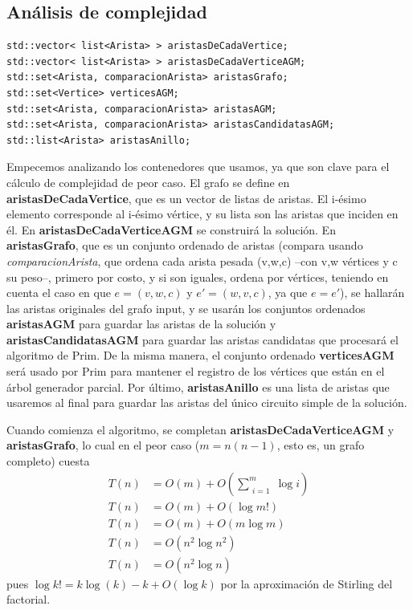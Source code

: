 \newpage

\subsection{Análisis de complejidad}

\begin{minipage}{\linewidth}
\begin{lstlisting}[basicstyle=\normalsize\ttfamily, frame=single]
std::vector< list<Arista> > aristasDeCadaVertice;
std::vector< list<Arista> > aristasDeCadaVerticeAGM;
std::set<Arista, comparacionArista> aristasGrafo;
std::set<Vertice> verticesAGM;
std::set<Arista, comparacionArista> aristasAGM;
std::set<Arista, comparacionArista> aristasCandidatasAGM;
std::list<Arista> aristasAnillo;
\end{lstlisting}
\end{minipage}

Empecemos analizando los contenedores que usamos, ya que son clave para el cálculo de complejidad de peor caso. El grafo se define en \textbf{aristasDeCadaVertice}, que es un vector de listas de aristas. El i-ésimo elemento corresponde al i-ésimo vértice, y su lista son las aristas que inciden en él. En \textbf{aristasDeCadaVerticeAGM} se construirá la solución. En \textbf{aristasGrafo}, que es un conjunto ordenado de aristas (compara usando \emph{comparacionArista}, que ordena cada arista pesada (v,w,c) --con v,w vértices y c su peso--, primero por costo, y si son iguales, ordena por vértices, teniendo en cuenta el caso en que $e = (v,w,c)$ y $e' = (w,v,c)$, ya que $e = e'$), se hallarán las aristas originales del grafo input, y se usarán los conjuntos ordenados \textbf{aristasAGM} para guardar las aristas de la solución y \textbf{aristasCandidatasAGM} para guardar las aristas candidatas que procesará el algoritmo de Prim. De la misma manera, el conjunto ordenado \textbf{verticesAGM} será usado por Prim para mantener el registro de los vértices que están en el árbol generador parcial. Por último, \textbf{aristasAnillo} es una lista de aristas que usaremos al final para guardar las aristas del único circuito simple de la solución.

Cuando comienza el algoritmo, se completan \textbf{aristasDeCadaVerticeAGM} y \textbf{aristasGrafo}, lo cual en el peor caso ($m = n (n - 1)$, esto es, un grafo completo) cuesta
\begin{align*}
T(n) &= O(m) + O\left(\sum\limits_{\substack{i = 1}}^m \log i\right) \\
T(n) &= O(m) + O(\log m!) \\
T(n) &= O(m) + O(m \log m) \\
T(n) &= O(n^2 \log n^2) \\
T(n) &= O(n^2 \log n)
\end{align*}
pues $\log k! = k \log(k) - k + O(\log k)$ por la aproximación de Stirling del factorial.

